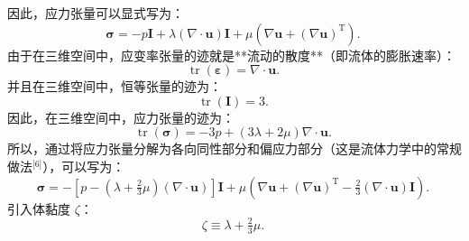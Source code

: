 因此，应力张量可以显式写为：
$$
\boldsymbol{\sigma} = -p\mathbf{I}
+ \lambda (\nabla \cdot \mathbf{u}) \mathbf{I}
+ \mu \left(\nabla \mathbf{u} + (\nabla \mathbf{u})^{\mathrm{T}}\right).~
$$
由于在三维空间中，应变率张量的迹就是**流动的散度**（即流体的膨胀速率）：
$$
\operatorname{tr}(\boldsymbol{\varepsilon}) = \nabla \cdot \mathbf{u}.~
$$
并且在三维空间中，恒等张量的迹为：
$$
\operatorname{tr}(\mathbf{I}) = 3.~
$$
因此，在三维空间中，应力张量的迹为：
$$
\operatorname{tr}(\boldsymbol{\sigma})
= -3p + (3\lambda + 2\mu)\nabla \cdot \mathbf{u}.~
$$
所以，通过将应力张量分解为各向同性部分和偏应力部分（这是流体力学中的常规做法\(^\text{[6]}\)），可以写为：
$$
\boldsymbol{\sigma} =
-\left[
p - \left(\lambda + \tfrac{2}{3}\mu\right)(\nabla \cdot \mathbf{u})
\right]\mathbf{I}
+ \mu \left(
\nabla \mathbf{u} + (\nabla \mathbf{u})^{\mathrm{T}}
- \tfrac{2}{3}(\nabla \cdot \mathbf{u})\mathbf{I}
\right).~
$$
引入体黏度 $\zeta$：
$$
\zeta \equiv \lambda + \tfrac{2}{3}\mu.~
$$
